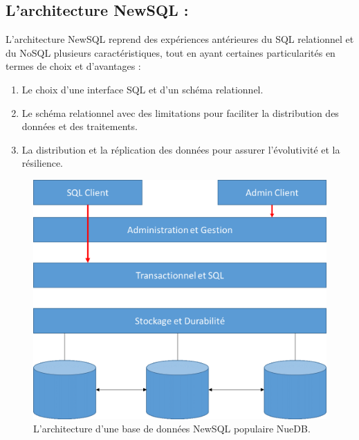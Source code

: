 \subsection{L’architecture NewSQL :}
L’architecture NewSQL reprend des expériences antérieures du SQL relationnel et du NoSQL plusieurs caractéristiques, tout en ayant certaines particularités en termes de choix et d’avantages : 
\begin{enumerate}
\item Le choix d’une interface SQL et d’un schéma relationnel. 
\item Le schéma relationnel avec des limitations pour faciliter la distribution des données et des traitements. 
\item La distribution et la réplication des données pour assurer l’évolutivité et la résilience. 
\end{enumerate}

\begin{figure}[h]
	\centering
    \includegraphics[scale=0.5]{img/part1/4.14}
    \caption{L'architecture d'une base de données NewSQL populaire NueDB.}
\end{figure}

